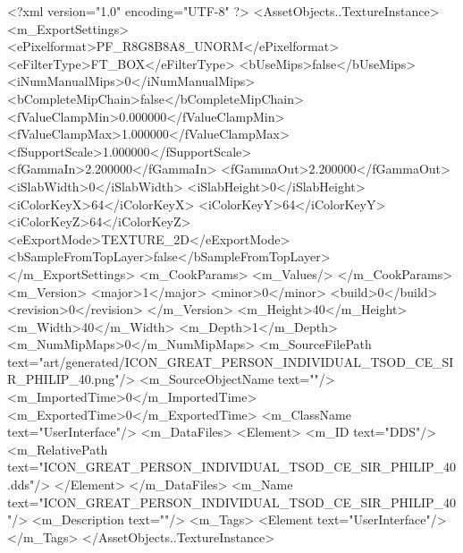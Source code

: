 <?xml version="1.0" encoding="UTF-8" ?>
<AssetObjects..TextureInstance>
	<m_ExportSettings>
		<ePixelformat>PF_R8G8B8A8_UNORM</ePixelformat>
		<eFilterType>FT_BOX</eFilterType>
		<bUseMips>false</bUseMips>
		<iNumManualMips>0</iNumManualMips>
		<bCompleteMipChain>false</bCompleteMipChain>
		<fValueClampMin>0.000000</fValueClampMin>
		<fValueClampMax>1.000000</fValueClampMax>
		<fSupportScale>1.000000</fSupportScale>
		<fGammaIn>2.200000</fGammaIn>
		<fGammaOut>2.200000</fGammaOut>
		<iSlabWidth>0</iSlabWidth>
		<iSlabHeight>0</iSlabHeight>
		<iColorKeyX>64</iColorKeyX>
		<iColorKeyY>64</iColorKeyY>
		<iColorKeyZ>64</iColorKeyZ>
		<eExportMode>TEXTURE_2D</eExportMode>
		<bSampleFromTopLayer>false</bSampleFromTopLayer>
	</m_ExportSettings>
	<m_CookParams>
		<m_Values/>
	</m_CookParams>
	<m_Version>
		<major>1</major>
		<minor>0</minor>
		<build>0</build>
		<revision>0</revision>
	</m_Version>
	<m_Height>40</m_Height>
	<m_Width>40</m_Width>
	<m_Depth>1</m_Depth>
	<m_NumMipMaps>0</m_NumMipMaps>
	<m_SourceFilePath text="art/generated/ICON_GREAT_PERSON_INDIVIDUAL_TSOD_CE_SIR_PHILIP_40.png"/>
	<m_SourceObjectName text=""/>
	<m_ImportedTime>0</m_ImportedTime>
	<m_ExportedTime>0</m_ExportedTime>
	<m_ClassName text="UserInterface"/>
	<m_DataFiles>
		<Element>
			<m_ID text="DDS"/>
			<m_RelativePath text="ICON_GREAT_PERSON_INDIVIDUAL_TSOD_CE_SIR_PHILIP_40.dds"/>
		</Element>
	</m_DataFiles>
	<m_Name text="ICON_GREAT_PERSON_INDIVIDUAL_TSOD_CE_SIR_PHILIP_40"/>
	<m_Description text=""/>
	<m_Tags>
		<Element text="UserInterface"/>
	</m_Tags>
</AssetObjects..TextureInstance>
